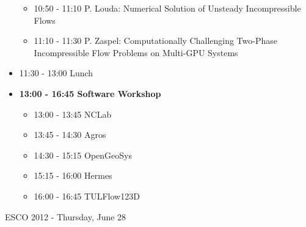 \documentclass[10pt, A4]{article}%
\begin{document}
\begin{itemize}
\begin{itemize}
    \item 10:50 - 11:10 P. Louda: Numerical Solution of Unsteady Incompressible Flows
    \item 11:10 - 11:30 P. Zaspel: Computationally Challenging Two-Phase Incompressible Flow Problems on Multi-GPU Systems
  \end{itemize}
  \item 11:30 - 13:00 Lunch
  \item {\bf 13:00 - 16:45 Software Workshop}
  \begin{itemize}
    \item 13:00 - 13:45 NCLab 
    \item 13:45 - 14:30 Agros
    \item 14:30 - 15:15 OpenGeoSys
    \item 15:15 - 16:00 Hermes
    \item 16:00 - 16:45 TULFlow123D 
  \end{itemize}
\end{itemize}

\newpage

\centerline{\huge ESCO 2012 - Thursday, June 28}
\vspace{4mm}
\end{document}
